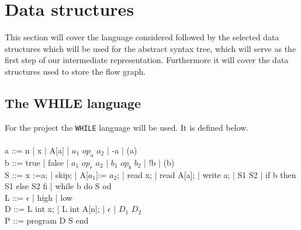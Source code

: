 \section{Data structures}
This section will cover the language considered followed by the selected data structures which will be used for the abstract syntax tree, which will serve as the first step of our intermediate representation. Furthermore it will cover the data structures used to store the flow graph.

\subsection{The WHILE language}
For the project the \texttt{WHILE} language will be used. It is defined below.
\\\\
a ::= n | x | A[a] | $a_1$ $op_a$ $a_2$ | -a | (a)\\
b ::= true | false | $a_1$ $op_r$ $a_2$ | $b_1$ $op_b$ $b_2$ | !b | (b)\\
S ::= x :=a; | skip; | A[$a_1$]:= $a_2$; | read x; | read A[a]; | write a; | S1 S2 | if b then S1 else S2 fi | while b do S od\\
L ::= $\epsilon$ | high | low\\
D ::= L int x; | L int A[n]; | $\epsilon$ | $D_1$ $D_2$\\
P ::= program D S end\\

